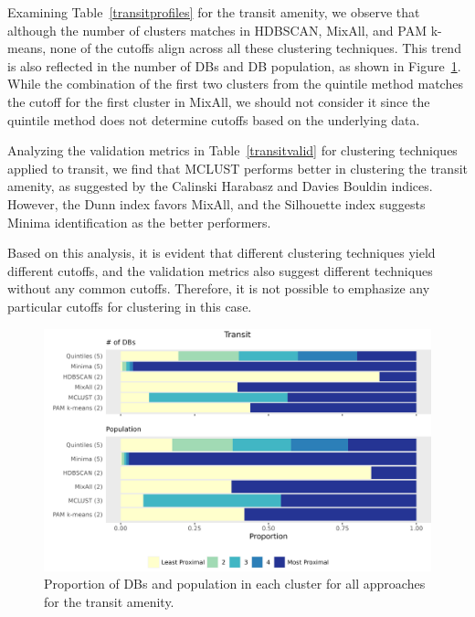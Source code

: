 \documentclass[11pt, a4paper]{article}
\begin{document}
Examining Table~\ref{transitprofiles} for the transit amenity, we observe that although the number of clusters matches in HDBSCAN, MixAll, and PAM k-means, none of the cutoffs align across all these clustering techniques. This trend is also reflected in the number of DBs and DB population, as shown in Figure~\ref{transitbarplot}. While the combination of the first two clusters from the quintile method matches the cutoff for the first cluster in MixAll, we should not consider it since the quintile method does not determine cutoffs based on the underlying data.
\par
Analyzing the validation metrics in Table~\ref{transitvalid} for clustering techniques applied to transit, we find that MCLUST performs better in clustering the transit amenity, as suggested by the Calinski Harabasz and Davies Bouldin indices. However, the Dunn index favors MixAll, and the Silhouette index suggests Minima identification as the better performers.
\par
Based on this analysis, it is evident that different clustering techniques yield different cutoffs, and the validation metrics also suggest different techniques without any common cutoffs. Therefore, it is not possible to emphasize any particular cutoffs for clustering in this case.




\begin{figure}[H]
\centering
\includegraphics[width=\textwidth]{./barplot_comparison/Transit_barplot.png}
\caption[Transit profile barplot]{Proportion of DBs and population in each cluster for all approaches for the transit amenity.}\label{transitbarplot}
\end{figure}
\end{document}
